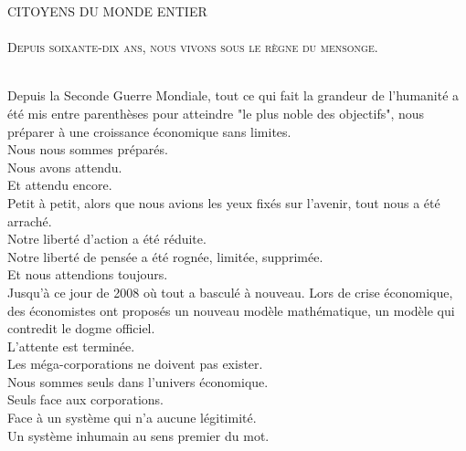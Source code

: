 \documentclass[11pt,twoside,a4paper]{article}
\begin{document}
\pagecolor{white}

\begin{center}
{\Huge CITOYENS DU MONDE ENTIER}~\\~\\
{\large \textsc{Depuis soixante-dix ans, nous vivons sous le r{\`e}gne du mensonge. }}~\\~\\
\end{center}

\begin{multicols}{2}

\setlength{\parindent}{0pt} %

Depuis la Seconde Guerre Mondiale, tout ce qui fait la grandeur de l'humanit{\'e} a {\'e}t{\'e} mis entre parenth{\`e}ses pour atteindre "le plus noble des objectifs", nous pr{\'e}parer {\`a} une croissance {\'e}conomique sans limites. ~\\

Nous nous sommes pr{\'e}par{\'e}s. ~\\
Nous avons attendu. ~\\
Et attendu encore. ~\\

Petit {\`a} petit, alors que nous avions les yeux fix{\'e}s sur l'avenir, tout nous a {\'e}t{\'e} arrach{\'e}. ~\\ 
Notre libert{\'e} d'action a {\'e}t{\'e} r{\'e}duite. ~\\
Notre libert{\'e} de pens{\'e}e a {\'e}t{\'e} rogn{\'e}e, limit{\'e}e, supprim{\'e}e. ~\\ %

Et nous attendions toujours. ~\\

Jusqu'{\`a} ce jour de 2008 o{\`u} tout a bascul{\'e} {\`a} nouveau. Lors de crise {\'e}conomique, des {\'e}conomistes ont propos{\'e}s un nouveau mod{\`e}le math{\'e}matique, un mod{\`e}le qui contredit le dogme officiel. ~\\ 

L'attente est termin{\'e}e. ~\\

Les m{\'e}ga-corporations ne doivent pas exister. ~\\
Nous sommes seuls dans l'univers {\'e}conomique. ~\\
Seuls face aux corporations. ~\\
Face {\`a} un syst{\`e}me qui n'a aucune l{\'e}gitimit{\'e}. ~\\ 
Un syst{\`e}me inhumain au sens premier du mot. ~\\


\end{multicols}
\end{document}
